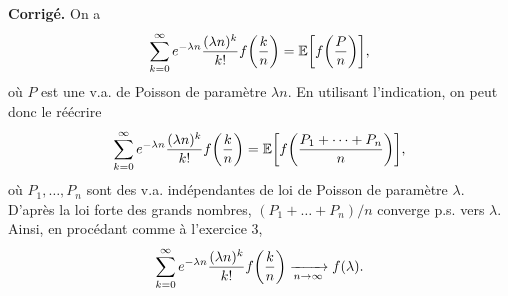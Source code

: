 \documentclass[a4paper,11pt]{article}
\let\originalleft\left
\let\originalright\right
\renewcommand{\left}{\mathopen{}\mathclose\bgroup\originalleft}
\renewcommand{\right}{\aftergroup\egroup\originalright}
\newcommand{\E}{\mathbb{E}}
\newcommand{\1}{\mathbbm{1}}
\theoremstyle{plain}
\theoremstyle{definition}
\renewenvironment{comment}{\medskip\noindent \textcolor{BrickRed}{\textbf{Corrigé.}}}{}
\begin{document}
\begin{comment}
On a 
\[
\sum_{k=0}^{\infty}e^{-\lambda n}\frac{(\lambda n)^k}{k!}f\left(\frac{k}{n} \right)
=\E\left[f\left(\frac{P}{n}\right)\right],
\] 
où $P$ est une v.a. de Poisson de paramètre $\lambda n$.
En utilisant l'indication, on peut donc le réécrire
\[
\sum_{k=0}^{\infty}e^{-\lambda n}\frac{(\lambda n)^k}{k!}f\left(\frac{k}{n} \right)
=\E\left[f\left(\frac{P_1+\dots+P_n}{n}\right)\right],
\] 
où $P_1,\dots,P_n$ sont des v.a. indépendantes de loi de Poisson de paramètre $\lambda$. D'après la loi forte des grands nombres, $(P_1+\dots+P_n)/n$ converge p.s. vers $\lambda$. Ainsi, en procédant comme à l'exercice 3,
\[
\sum_{k=0}^{\infty}e^{-\lambda n}\frac{(\lambda n)^k}{k!}f\left(\frac{k}{n}\right)
\xrightarrow[n\to\infty]{} f(\lambda).
\]
\end{comment}
\end{document}
